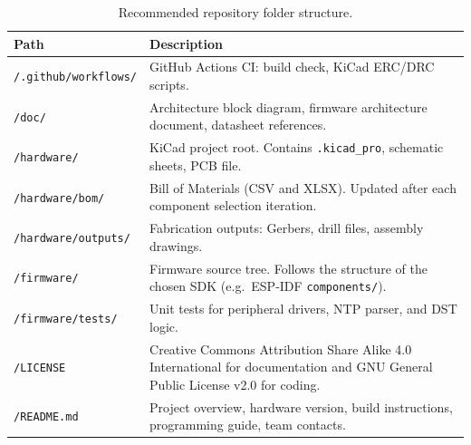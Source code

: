 \begin{table}[ht]
    \caption{Recommended repository folder structure.}
    \label{tab:repo}
    \begin{center}
        \begin{tabular}{L{4.5cm}L{10cm}}
            \toprule[1.5pt]
            \textbf{Path} & \textbf{Description} \\
            \midrule
            \texttt{/.github/workflows/}    & GitHub Actions CI: build check, KiCad ERC/DRC scripts. \\
            \texttt{/doc/}                 & Architecture block diagram, firmware architecture document, datasheet references. \\
            \texttt{/hardware/}                   & KiCad project root. Contains \texttt{.kicad\_pro}, schematic sheets, PCB file. \\
            \texttt{/hardware/bom/}               & Bill of Materials (CSV and XLSX). Updated after each component selection iteration. \\
            \texttt{/hardware/outputs/}               & Fabrication outputs: Gerbers, drill files, assembly drawings. \\
            \texttt{/firmware/}                   & Firmware source tree. Follows the structure of the chosen SDK (e.g.\ ESP-IDF \texttt{components/}). \\
            \texttt{/firmware/tests/}             & Unit tests for peripheral drivers, NTP parser, and DST logic. \\
            \texttt{/LICENSE}               & Creative Commons
            Attribution Share Alike 4.0 International for documentation and GNU
            General Public License v2.0 for coding. \\
            \texttt{/README.md}             & Project overview, hardware version, build instructions, programming guide, team contacts. \\
            \bottomrule[1.5pt]
        \end{tabular}
    \end{center}
\end{table}

